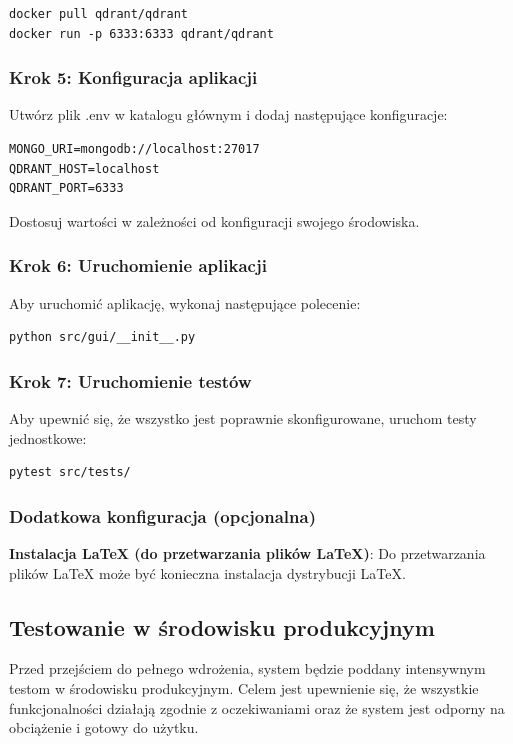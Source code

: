 \documentclass[a4paper, 12pt]{article}
\begin{document}
\begin{verbatim}
docker pull qdrant/qdrant
docker run -p 6333:6333 qdrant/qdrant
\end{verbatim}

\subsubsection*{Krok 5: Konfiguracja aplikacji}

Utwórz plik .env w katalogu głównym i dodaj następujące konfiguracje:
\begin{verbatim}
MONGO_URI=mongodb://localhost:27017
QDRANT_HOST=localhost
QDRANT_PORT=6333
\end{verbatim}
Dostosuj wartości w zależności od konfiguracji swojego środowiska.

\subsubsection*{Krok 6: Uruchomienie aplikacji}

Aby uruchomić aplikację, wykonaj następujące polecenie:
\begin{verbatim}
python src/gui/__init__.py
\end{verbatim}

\subsubsection*{Krok 7: Uruchomienie testów}

Aby upewnić się, że wszystko jest poprawnie skonfigurowane, uruchom testy jednostkowe:
\begin{verbatim}
pytest src/tests/
\end{verbatim}

\subsubsection*{Dodatkowa konfiguracja (opcjonalna)}

\textbf{Instalacja LaTeX (do przetwarzania plików LaTeX)}: Do przetwarzania plików LaTeX może być konieczna instalacja dystrybucji LaTeX.

\subsection{Testowanie w środowisku produkcyjnym}

Przed przejściem do pełnego wdrożenia, system będzie poddany intensywnym testom w środowisku produkcyjnym. Celem jest upewnienie się, że wszystkie funkcjonalności działają zgodnie z oczekiwaniami oraz że system jest odporny na obciążenie i gotowy do użytku.
\end{document}
